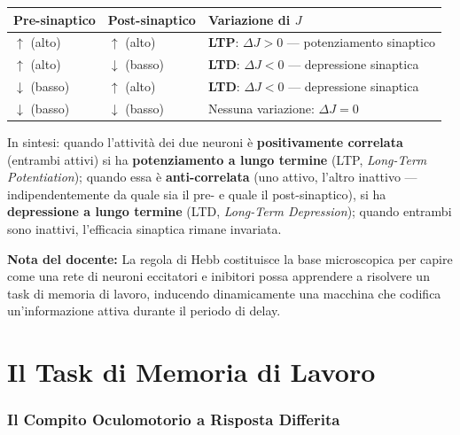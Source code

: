 \begin{table}[htbp]
    \centering
    \renewcommand{\arraystretch}{1.3}
    \begin{tabularx}{\textwidth}{|X|X|X|}
    \hline
    \textbf{Pre-sinaptico} & \textbf{Post-sinaptico} & \textbf{Variazione di $J$} \\
    \hline
    $\uparrow$ (alto) & $\uparrow$ (alto) & \textbf{LTP}: $\Delta J > 0$ — potenziamento sinaptico \\
    \hline
    $\uparrow$ (alto) & $\downarrow$ (basso) & \textbf{LTD}: $\Delta J < 0$ — depressione sinaptica \\
    \hline
    $\downarrow$ (basso) & $\uparrow$ (alto) & \textbf{LTD}: $\Delta J < 0$ — depressione sinaptica \\
    \hline
    $\downarrow$ (basso) & $\downarrow$ (basso) & Nessuna variazione: $\Delta J = 0$ \\
    \hline
    \end{tabularx}
\end{table}

In sintesi: quando l'attività dei due neuroni è \textbf{positivamente correlata} (entrambi attivi) si ha \textbf{potenziamento a lungo termine} (LTP, \textit{Long-Term Potentiation}); quando essa è \textbf{anti-correlata} (uno attivo, l'altro inattivo — indipendentemente da quale sia il pre- e quale il post-sinaptico), si ha \textbf{depressione a lungo termine} (LTD, \textit{Long-Term Depression}); quando entrambi sono inattivi, l'efficacia sinaptica rimane invariata.

\begin{tcolorbox}[colback=gray!5, colframe=gray!40, arc=2mm, boxrule=0.5pt]
\textbf{Nota del docente:} La regola di Hebb costituisce la base microscopica per capire come una rete di neuroni eccitatori e inibitori possa apprendere a risolvere un task di memoria di lavoro, inducendo dinamicamente una macchina che codifica un'informazione attiva durante il periodo di delay. 
\end{tcolorbox}

\section{Il Task di Memoria di Lavoro}

\subsubsection{Il Compito Oculomotorio a Risposta Differita}


